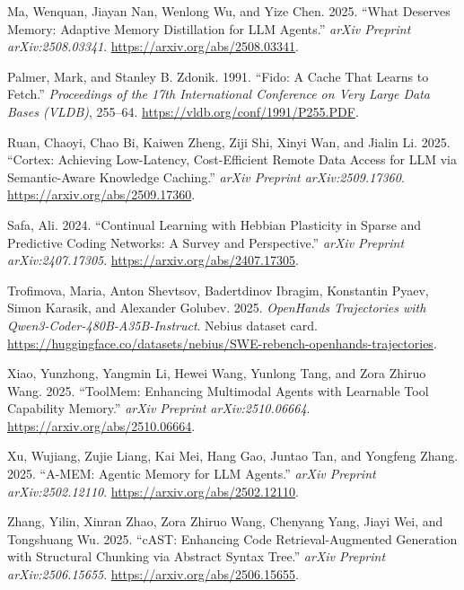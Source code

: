 \documentclass[
  american,
  11pt,
]{article}
\newlength{\cslhangindent}
\newenvironment{CSLReferences}[2] %
 {\begin{list}{}{%
  \setlength{\itemindent}{0pt}
  \setlength{\leftmargin}{0pt}
  \setlength{\parsep}{0pt}
  \ifodd #1
   \setlength{\leftmargin}{\cslhangindent}
   \setlength{\itemindent}{-1\cslhangindent}
  \fi
  \setlength{\itemsep}{#2\baselineskip}}}
 {\end{list}}
\begin{document}
\begin{CSLReferences}{1}{1}
Ma, Wenquan, Jiayan Nan, Wenlong Wu, and Yize Chen. 2025. {``What Deserves Memory: Adaptive Memory
Distillation for {LLM} Agents.''} \emph{arXiv Preprint arXiv:2508.03341}.
\url{https://arxiv.org/abs/2508.03341}.

Palmer, Mark, and Stanley B. Zdonik. 1991. {``Fido: A Cache That Learns to Fetch.''} \emph{Proceedings of the
17th International Conference on Very Large Data Bases (VLDB)}, 255--64.
\url{https://vldb.org/conf/1991/P255.PDF}.

Ruan, Chaoyi, Chao Bi, Kaiwen Zheng, Ziji Shi, Xinyi Wan, and Jialin Li. 2025. {``Cortex: Achieving
Low-Latency, Cost-Efficient Remote Data Access for {LLM} via Semantic-Aware Knowledge Caching.''} \emph{arXiv
Preprint arXiv:2509.17360}. \url{https://arxiv.org/abs/2509.17360}.

Safa, Ali. 2024. {``Continual Learning with Hebbian Plasticity in Sparse and Predictive Coding Networks: A
Survey and Perspective.''} \emph{arXiv Preprint arXiv:2407.17305}. \url{https://arxiv.org/abs/2407.17305}.

Trofimova, Maria, Anton Shevtsov, Badertdinov Ibragim, Konstantin Pyaev, Simon Karasik, and Alexander Golubev.
2025. \emph{{OpenHands} Trajectories with {Qwen3-Coder-480B-A35B-Instruct}}. Nebius dataset card.
\url{https://huggingface.co/datasets/nebius/SWE-rebench-openhands-trajectories}.

Xiao, Yunzhong, Yangmin Li, Hewei Wang, Yunlong Tang, and Zora Zhiruo Wang. 2025. {``{ToolMem}: Enhancing
Multimodal Agents with Learnable Tool Capability Memory.''} \emph{arXiv Preprint arXiv:2510.06664}.
\url{https://arxiv.org/abs/2510.06664}.

Xu, Wujiang, Zujie Liang, Kai Mei, Hang Gao, Juntao Tan, and Yongfeng Zhang. 2025. {``{A-MEM}: Agentic Memory
for {LLM} Agents.''} \emph{arXiv Preprint arXiv:2502.12110}. \url{https://arxiv.org/abs/2502.12110}.

Zhang, Yilin, Xinran Zhao, Zora Zhiruo Wang, Chenyang Yang, Jiayi Wei, and Tongshuang Wu. 2025. {``{cAST}:
Enhancing Code Retrieval-Augmented Generation with Structural Chunking via Abstract Syntax Tree.''}
\emph{arXiv Preprint arXiv:2506.15655}. \url{https://arxiv.org/abs/2506.15655}.

\end{CSLReferences}
\end{document}
